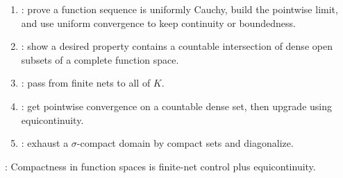 \begin{method} \label{meth:function-space-compactness-proof-patterns} 
\begin{enumerate}[label=(\roman*)]
\setlength{\itemsep}{0pt}
\item {}: prove a function sequence is uniformly Cauchy, build the pointwise limit, and use uniform convergence to keep continuity or boundedness.
\item {}: show a desired property contains a countable intersection of dense open subsets of a complete function space.
\item {}: pass from finite nets to all of $K$.
\item {}: get pointwise convergence on a countable dense set, then upgrade using equicontinuity.
\item {}: exhaust a $\sigma$-compact domain by compact sets and diagonalize.
\end{enumerate}
: Compactness in function spaces is finite-net control plus equicontinuity.
\end{method}
